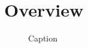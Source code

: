 \section{Overview}
    \begin{figure}
        \centering
        
        \caption{Caption}
        \label{fig:SchIM_overview_schema}
    \end{figure}
